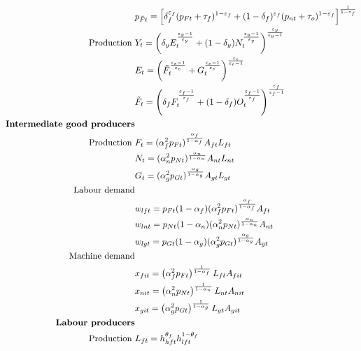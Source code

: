 \begin{align}
& p_{\tilde{F}t}= \left[\delta_f^{\varepsilon_f}(p_{Ft}+\tau_{f})^{1-\varepsilon_f}+(1-\delta_f)^{\varepsilon_f}(p_{nt}+\tau_{o})^{1-\varepsilon_f}\right]^\frac{1}{1-\varepsilon_f}
\\
\text{Production}\ \vspace{4mm}& 
Y_t=\left(\delta_yE_t^\frac{\varepsilon_y-1}{\varepsilon_y}+(1-\delta_y)N_t^\frac{\varepsilon_y-1}{\varepsilon_y}\right)^\frac{\varepsilon_y}{\varepsilon_y-1}\\
&E_t=\left(\tilde{F}_t^\frac{\varepsilon_e-1}{\varepsilon_e}+G_t^\frac{\varepsilon_e-1}{\varepsilon_e}\right)^\frac{\varepsilon_e}{\varepsilon_e-1}\\
&\tilde{F}_t=\left(\delta_fF_t^\frac{\varepsilon_f-1}{\varepsilon_f}+(1-\delta_f)O_t^\frac{\varepsilon_f-1}{\varepsilon_f}\right)^\frac{\varepsilon_f}{\varepsilon_f-1}
\\
\text{\textbf{Intermediate good producers}}&\\
\text{Production}\ \vspace{4mm}& F_t= (\alpha_f^2p_{Ft})^\frac{ \alpha_f}{1-\alpha_f}A_{ft}L_{ft}\\
&N_t= (\alpha_n^2p_{Nt})^\frac{ \alpha_n}{1-\alpha_n}A_{nt}L_{nt}\\
&G_t= (\alpha_g^2p_{Gt})^\frac{ \alpha_g}{1-\alpha_g}A_{gt}L_{gt}\\
%
\text{Labour demand}\label{eq:lab_demand}\\
& w_{lft}=p_{Ft}(1-\alpha_f)(\alpha_f^2p_{Ft})^\frac{\alpha_f}{1-\alpha_f}A_{ft}\\
& w_{lnt}=p_{Nt}(1-\alpha_n)(\alpha_n^2p_{Nt})^\frac{\alpha_n}{1-\alpha_n}A_{nt}\\
& w_{lgt}=p_{Gt}(1-\alpha_g)(\alpha_g^2p_{Gt})^\frac{\alpha_g}{1-\alpha_g}A_{gt}
\\
\text{Machine demand}&
\\
&x_{fit}= \left(\alpha_f^2 p_{Ft}\right)^\frac{1}{1-\alpha_f}L_{ft}A_{fit}\\
&x_{nit}= \left(\alpha_n^2 p_{Nt}\right)^\frac{1}{1-\alpha_n}L_{nt}A_{nit}\\
&x_{git}= \left(\alpha_g^2 p_{Gt}\right)^\frac{1}{1-\alpha_g}L_{gt}A_{git}
\\
\text{\textbf{Labour producers}}&
\\
\text{Production}\ \vspace{4mm}& L_{ft}=h_{hft}^{\theta_{f}}h_{lft}^{1-\theta_{f}}\\

\end{align}
